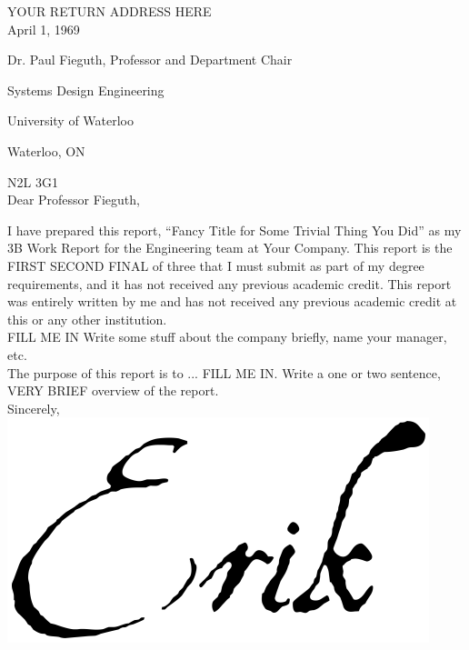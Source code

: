 \documentclass[12pt]{article}
\title{\reportTitle}
\author{\studentName}
\date{\reportDueDate}
\def\reportTitle{Fancy Title for Some Trivial Thing You Did}
\def\company{Your Company}
\begin{document}
    
    \startindent
	\makewtrtitle
	\stopindent
	
	
	\begin{singlespace}

		YOUR RETURN ADDRESS HERE \\

    	April 1, 1969

		Dr. Paul Fieguth, Professor and Department Chair
	
		Systems Design Engineering
	
	    University of Waterloo
	
	    Waterloo, ON
	
	    N2L 3G1\\
	
		Dear Professor Fieguth,
	\end{singlespace}
    
        I have prepared this report, “\reportTitle” as my 3B Work Report for the Engineering team at \company. This report is the FIRST SECOND FINAL of three that I must submit as part of my degree requirements, and it has not received any previous academic credit. This report was entirely written by me and has not received any previous academic credit at this or any other institution.\\
    	
    	FILL ME IN Write some stuff about the company briefly, name your manager, etc. \\
    	
    	The purpose of this report is to ... FILL ME IN. Write a one or two sentence, VERY BRIEF overview of the report. \\


	    \noindent
	    Sincerely,\\
	    \includegraphics[scale =0.2]{signature}\\
    	
\end{document}
